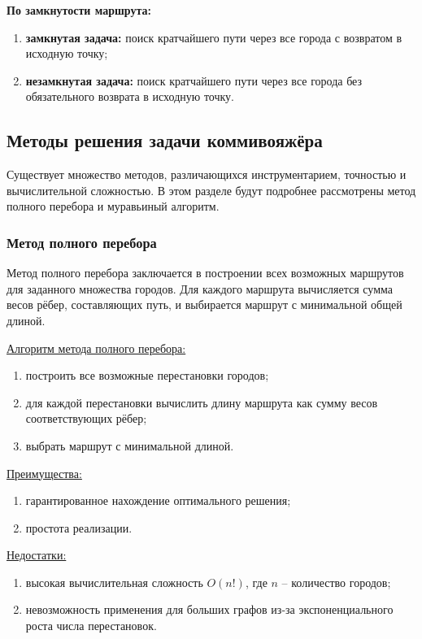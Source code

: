 \textbf{По замкнутости маршрута:}
\begin{enumerate}[label=\arabic*)]
    \item \textbf{замкнутая задача:} поиск кратчайшего пути через все города с возвратом в исходную точку;
    \item \textbf{незамкнутая задача:} поиск кратчайшего пути через все города без обязательного возврата в исходную точку.~\cite{galautdinov}
\end{enumerate}

\subsection{Методы решения задачи коммивояжёра}

\hspace{1.25cm}
Существует множество методов, различающихся инструментарием, точностью и вычислительной сложностью. В этом разделе будут подробнее рассмотрены метод полного перебора и муравьиный алгоритм.

\subsubsection{Метод полного перебора}

\hspace{1.25cm}
Метод полного перебора заключается в построении всех возможных маршрутов для заданного множества городов. Для каждого маршрута вычисляется сумма весов рёбер, составляющих путь, и выбирается маршрут с минимальной общей длиной.

\underline{Алгоритм метода полного перебора:}
\begin{enumerate}[label=\arabic*)]
    \item построить все возможные перестановки городов;
    \item для каждой перестановки вычислить длину маршрута как сумму весов соответствующих рёбер;
    \item выбрать маршрут с минимальной длиной.
\end{enumerate}

\underline{Преимущества:}
\begin{enumerate}[label=\arabic*)]
    \item гарантированное нахождение оптимального решения;
    \item простота реализации.
\end{enumerate}

\underline{Недостатки:}
\begin{enumerate}[label=\arabic*)]
    \item высокая вычислительная сложность $O(n!)$, где $n$ -- количество городов;
    \item невозможность применения для больших графов из-за экспоненциального роста числа перестановок.
\end{enumerate}

